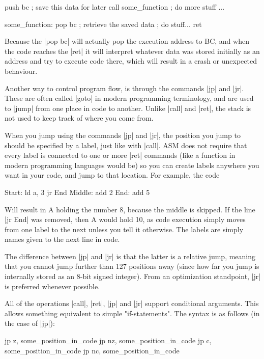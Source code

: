 \documentclass[11pt]{book}
\begin{document}
\begin{code}
push bc ; save this data for later 
call some_function 
; do more stuff 
...

some_function:
  pop bc ; retrieve the saved data 
  ; do stuff...
  ret 
\end{code}

Because the |pop bc| will actually pop the execution address to BC, and when the code reaches the |ret| it will interpret whatever data was stored initially as an address and try to execute code there, which will result in a crash or unexpected behaviour. 

Another way to control program flow, is through the commands |jp| and |jr|. These are often called |goto| in modern programming terminology, and are used to |jump| from one place in code to another. Unlike |call| and |ret|, the stack is not used to keep track of where you come from. 

When you jump using the commands |jp| and |jr|, the position you jump to should be specified by a label, just like with |call|. ASM does not require that every label is connected to one or more |ret| commands (like a function in modern programming languages would be) so you can create labels anywhere you want in your code, and jump to that location. For example, the code 

\begin{code}
Start:
  ld a, 3
  jr End
Middle:
  add 2
End:
  add 5
\end{code}

Will result in A holding the number 8, because the middle is skipped. If the line |jr End| was removed, then A would hold 10, as code execution simply moves from one label to the next unless you tell it otherwise. The labels are simply names given to the next line in code.

The difference between |jp| and |jr| is that the latter is a relative jump, meaning that you cannot jump further than 127 positions away (since how far you jump is internally stored as an 8-bit signed integer). From an optimization standpoint, |jr| is preferred whenever possible.

All of the operations |call|, |ret|, |jp| and |jr| support conditional arguments. This allows something equivalent to simple "if-statements". The syntax is as follows (in the case of |jp|):

\begin{code}
jp z, some_position_in_code
jp nz, some_position_in_code 
jp c, some_position_in_code
jp nc, some_position_in_code 
\end{code}
\end{document}
